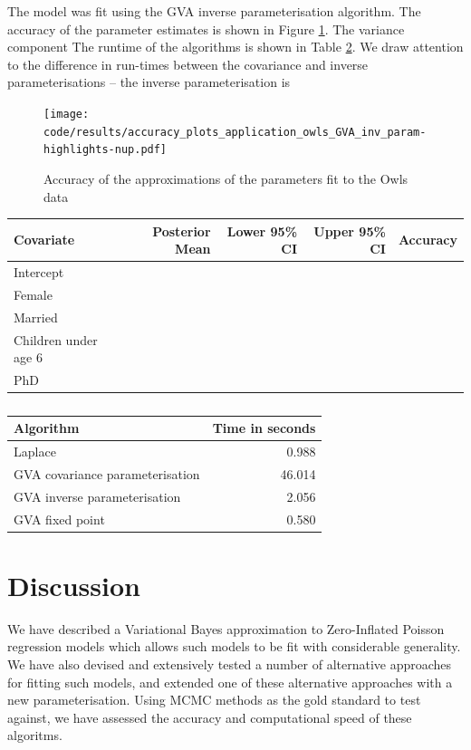 			The model was fit using the GVA inverse parameterisation algorithm. The accuracy of the parameter
			estimates is shown in Figure \ref{fig:owls}. The variance component
			The runtime of the algorithms is shown in Table
			\ref{tab:owls_times}. We draw attention to the difference in run-times between the covariance and
			inverse parameterisations -- the inverse parameterisation is 

			\begin{figure}
				\texttt{[image: code/results/accuracy\_plots\_application\_owls\_GVA\_inv\_param-highlights-nup.pdf]}
				\caption{Accuracy of the approximations of the parameters fit to the Owls data}
				\label{fig:owls}
			\end{figure}

			\begin{table}
				\begin{tabular}{|l|rrrr|}
					\hline
					Covariate          & Posterior Mean & Lower 95\% CI & Upper 95\% CI & Accuracy \\
					\hline
					Intercept & \\
					Female & \\
					Married & \\
					Children under age 6 & \\
					PhD & \\
					\hline
				\end{tabular}			
				\label{tab:owls_results}
			\end{table}

			\begin{table}
				\begin{tabular}{|l|r|}
				\hline
				Algorithm & Time in seconds \\
				\hline
				Laplace & 0.988 \\
				GVA covariance parameterisation & 46.014 \\
				GVA inverse parameterisation & 2.056 \\
				GVA fixed point & 0.580 \\
				\hline
				\end{tabular}
				\caption{}
				\label{tab:owls_times}
			\end{table}

			\section{Discussion}
			\label{sec:discussion}
					
			We have described a Variational Bayes approximation to Zero-Inflated Poisson regression models which allows
			such models to be fit with considerable generality. We have also devised and extensively tested a number of
			alternative approaches for fitting such models, and extended one of these alternative approaches with a new
			parameterisation. Using MCMC methods as the gold standard to test against, we have assessed the accuracy and
			computational speed of these algoritms.
					
